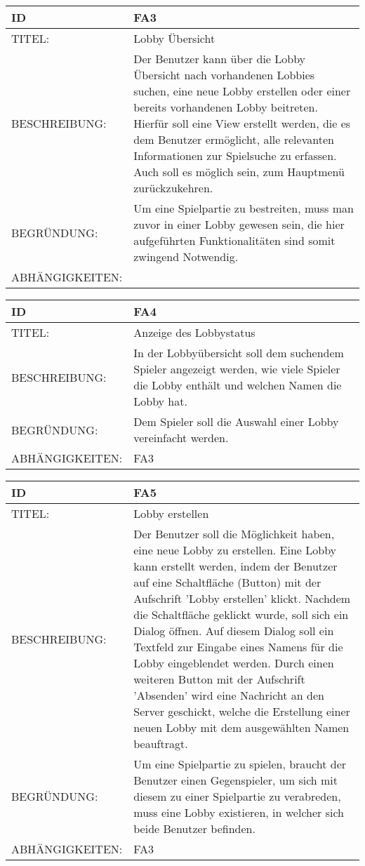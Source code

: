 \documentclass{uulm-assignment}
\begin{document}
\begin{tabularx}{16cm}{l|X}
\textbf{ID} & \textbf{FA3} \\
\hline
TITEL: & Lobby Übersicht \\
\hline
BESCHREIBUNG: & Der Benutzer kann über die Lobby Übersicht nach vorhandenen Lobbies suchen, eine neue Lobby erstellen oder einer bereits vorhandenen Lobby beitreten. Hierfür soll eine View erstellt werden, die es dem Benutzer ermöglicht, alle relevanten Informationen zur Spielsuche zu erfassen.
Auch soll es möglich sein, zum Hauptmenü zurückzukehren.
\\
\hline
BEGRÜNDUNG: & Um eine Spielpartie zu bestreiten, muss man zuvor in einer Lobby gewesen sein, die hier aufgeführten Funktionalitäten sind somit zwingend Notwendig. \\
\hline
ABHÄNGIGKEITEN: & \\
\end{tabularx}

\begin{tabularx}{16cm}{l|X}
\textbf{ID} & \textbf{FA4} \\
\hline
TITEL: & Anzeige des Lobbystatus \\
\hline
BESCHREIBUNG: & In der Lobbyübersicht soll dem suchendem Spieler angezeigt werden, wie viele Spieler die Lobby enthält und welchen Namen die Lobby hat.
\\
\hline
BEGRÜNDUNG: & Dem Spieler soll die Auswahl einer Lobby vereinfacht werden.\\
\hline
ABHÄNGIGKEITEN: & FA3\\
\end{tabularx}


\begin{tabularx}{16cm}{l|X}
\textbf{ID} & \textbf{FA5} \\
\hline
TITEL: & Lobby erstellen \\
\hline
BESCHREIBUNG: & Der Benutzer soll die Möglichkeit haben, eine neue Lobby zu erstellen. Eine Lobby kann erstellt werden, indem der Benutzer auf eine Schaltfläche (Button) mit der Aufschrift 'Lobby erstellen' klickt. Nachdem die Schaltfläche geklickt wurde, soll sich ein Dialog öffnen. Auf diesem Dialog soll ein Textfeld zur Eingabe eines Namens für die Lobby eingeblendet werden. Durch einen weiteren Button mit der Aufschrift 'Absenden' wird eine Nachricht an den Server geschickt, welche die Erstellung einer neuen Lobby mit dem ausgewählten Namen beauftragt.
\\
\hline
BEGRÜNDUNG: & Um eine Spielpartie zu spielen, braucht der Benutzer einen Gegenspieler, um sich mit diesem zu einer Spielpartie zu verabreden, muss eine Lobby existieren, in welcher sich beide Benutzer befinden. \\
\hline
ABHÄNGIGKEITEN: & FA3\\
\end{tabularx}
\end{document}
